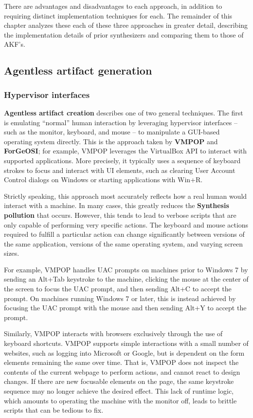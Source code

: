 There are advantages and disadvantages to each approach, in addition to
requiring distinct implementation techniques for each. The remainder of
this chapter analyzes these each of these three approaches in greater
detail, describing the implementation details of prior synthesizers and
comparing them to those of AKF's.

\subsection{Agentless artifact
generation}\label{agentless-artifact-generation}

\subsubsection{Hypervisor
interfaces}\label{hypervisor-interfaces}

\textbf{Agentless artifact creation} describes one of two general
techniques. The first is emulating ``normal'' human interaction by
leveraging hypervisor interfaces -- such as the monitor, keyboard, and
mouse -- to manipulate a GUI-based operating system directly. This is
the approach taken by \textbf{VMPOP} and \textbf{ForGeOSI}; for example,
VMPOP leverages the VirtualBox API to interact with supported
applications. More precisely, it typically uses a sequence of keyboard
strokes to focus and interact with UI elements, such as clearing User
Account Control dialogs on Windows or starting applications with Win+R.

Strictly speaking, this approach most accurately reflects how a real
human would interact with a machine. In many cases, this greatly reduces
the \textbf{Synthesis pollution} that occurs. However, this tends to
lead to verbose scripts that are only capable of performing very
specific actions. The keyboard and mouse actions required to fulfill a
particular action can change significantly between versions of the same
application, versions of the same operating system, and varying screen
sizes.

For example, VMPOP handles UAC prompts on machines prior to Windows 7 by
sending an Alt+Tab keystroke to the machine, clicking the mouse at the
center of the screen to focus the UAC prompt, and then sending Alt+C to
accept the prompt. On machines running Windows 7 or later, this is
instead achieved by focusing the UAC prompt with the mouse and then
sending Alt+Y to accept the prompt.

Similarly, VMPOP interacts with browsers exclusively through the use of
keyboard shortcuts. VMPOP supports simple interactions with a small
number of websites, such as logging into Microsoft or Google, but is
dependent on the form elements remaining the same over time. That is,
VMPOP does not inspect the contents of the current webpage to perform
actions, and cannot react to design changes. If there are new focusable
elements on the page, the same keystroke sequence may no longer achieve
the desired effect. This lack of runtime logic, which amounts to
operating the machine with the monitor off, leads to brittle scripts
that can be tedious to fix.

